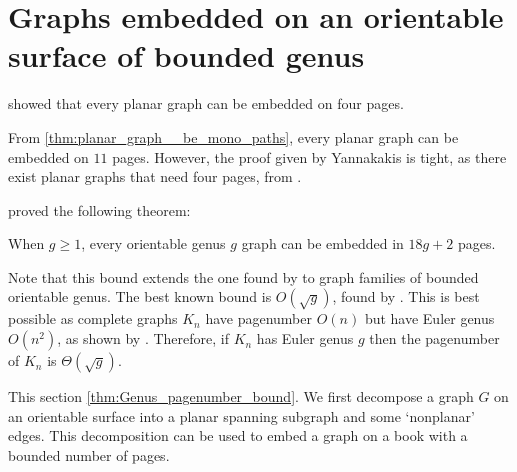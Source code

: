 
\section{Graphs embedded on an orientable surface of bounded genus}\label{sec:pagenumber_bounded_genus}

\textcite{yannakakisEmbeddingPlanarGraphs1989} showed that every planar graph can be embedded on four pages.

From \cref{thm:planar_graph__be_mono_paths}, every planar graph can be embedded on $11$ pages. However, the proof given by Yannakakis is tight, as there exist planar graphs that need four pages, from \textcite{yannakakisPlanarGraphsThat2020,bekosFourPagesAre2020}. 

\textcite{heathPagenumberGenusGraphs1992} proved the following theorem:
\begin{theorem}\label{thm:Genus_pagenumber_bound}
	When $g \geq 1$, every orientable genus $g$ graph can be embedded in $18g+2$ pages.
\end{theorem}
Note that this bound extends the one found by \textcite{yannakakisEmbeddingPlanarGraphs1989} to graph families of bounded orientable genus.
The best known bound is \(O(\sqrt{g})\), found by \textcite{malitzGenusGraphsHave1994}. This is best possible as complete graphs $K_n$ have pagenumber $O(n)$ but have Euler genus $O(n^2)$, as shown by \textcite{ringelMapColorTheorem1974}. Therefore, if $K_n$ has Euler genus $g$ then the pagenumber of $K_n$ is $\Theta(\sqrt{g})$.


This section \cref{thm:Genus_pagenumber_bound}. We first decompose a graph $G$ on an orientable surface into a planar spanning subgraph and some `nonplanar' edges. This decomposition can be used to embed a graph on a book with a bounded number of pages.

